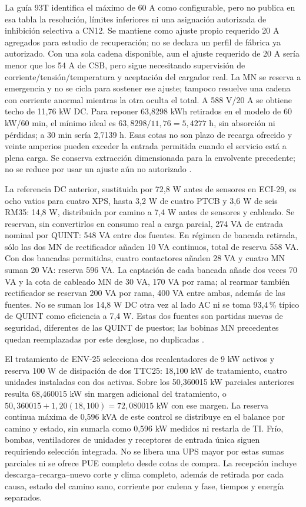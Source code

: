 La guía 93T identifica el máximo de 60 A como configurable, pero no publica en esa tabla la resolución, límites inferiores ni una asignación autorizada de inhibición selectiva a CN12. Se mantiene como ajuste propio requerido 20 A agregados para estudio de recuperación; no se declara un perfil de fábrica ya autorizado. Con una sola cadena disponible, aun el ajuste requerido de 20 A sería menor que los 54 A de CSB, pero sigue necesitando supervisión de corriente/tensión/temperatura y aceptación del cargador real. La MN se reserva a emergencia y no se cicla para sostener ese ajuste; tampoco resuelve una cadena con corriente anormal mientras la otra oculta el total. A 588 V/20 A se obtiene techo de 11,76 kW DC. Para reponer 63,8298 kWh retirados en el modelo de 60 kW/60 min, el mínimo ideal es $63,8298/11,76=5,4277$ h, sin absorción ni pérdidas; a 30 min sería 2,7139 h. Esas cotas no son plazo de recarga ofrecido y veinte amperios pueden exceder la entrada permitida cuando el servicio está a plena carga. Se conserva extracción dimensionada para la envolvente precedente; no se reduce por usar un ajuste aún no autorizado \parencites[p.~98]{p7-eaton-93t-guia}{csbHRL12540WRA260131}.

La referencia DC anterior, sustituida por 72,8 W antes de sensores en ECI-29, es ocho vatios para cuatro XPS, hasta 3,2 W de cuatro PTCB y 3,6 W de seis RM35: 14,8 W, distribuida por camino a 7,4 W antes de sensores y cableado. Se reservan, sin convertirlos en consumo real a carga parcial, 274 VA de entrada nominal por QUINT: 548 VA entre dos fuentes. En régimen de bancada retirada, sólo las dos MN de rectificador añaden 10 VA continuos, total de reserva 558 VA. Con dos bancadas permitidas, cuatro contactores añaden 28 VA y cuatro MN suman 20 VA: reserva 596 VA. La captación de cada bancada añade dos veces 70 VA y la cota de cableado MN de 30 VA, 170 VA por rama; al rearmar también rectificador se reservan 200 VA por rama, 400 VA entre ambas, además de las fuentes. No se suman los 14,8 W DC otra vez al lado AC ni se toma 93,4\,\% típico de QUINT como eficiencia a 7,4 W. Estas dos fuentes son partidas nuevas de seguridad, diferentes de las QUINT de puestos; las bobinas MN precedentes quedan reemplazadas por este desglose, no duplicadas \parencites[pp.~3--4]{p6-puestos-quint}{lote26-ptcb}[p.~21]{lote26-xpsmanual}[p.~1]{lote26-rm35}[p.~2]{lote26-contactor}[pp.~C-37 y E-20]{lote23-nsx2026}.

El tratamiento de ENV-25 selecciona dos recalentadores de 9 kW activos y reserva 100 W de disipación de dos TTC25: 18,100 kW de tratamiento, cuatro unidades instaladas con dos activas. Sobre los 50,360015 kW parciales anteriores resulta 68,460015 kW sin margen adicional del tratamiento, o $50,360015+1,20(18,100)=72,080015$ kW con ese margen. La reserva continua máxima de 0,596 kVA de este control se distribuye en el balance por camino y estado, sin sumarla como 0,596 kW medidos ni restarla de TI. Frío, bombas, ventiladores de unidades y receptores de entrada única siguen requiriendo selección integrada. No se libera una UPS mayor por estas sumas parciales ni se ofrece PUE completo desde cotas de compra. La recepción incluye descarga--recarga--nuevo corte y clima completo, además de retirada por cada causa, estado del camino sano, corriente por cadena y fase, tiempos y energía separados.
